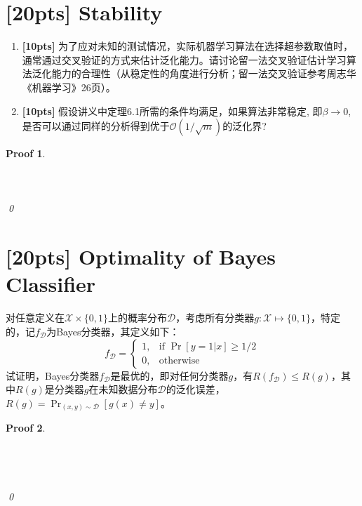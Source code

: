 \documentclass[a4paper,UTF8]{article}
\numberwithin{equation}{section}
\newtheorem*{myProof}{Proof}
\begin{document}
	\section{[20pts] Stability}
	\noindent
	
	\begin{enumerate}[ {(}1{)}]
		\item \textbf{[10pts]} 为了应对未知的测试情况，实际机器学习算法在选择超参数取值时，通常通过交叉验证的方式来估计泛化能力。请讨论留一法交叉验证估计学习算法泛化能力的合理性（从稳定性的角度进行分析；留一法交叉验证参考周志华《机器学习》26页）。
		\item \textbf{[10pts]} 假设讲义中定理6.1所需的条件均满足，如果算法非常稳定, 即$\beta\rightarrow 0$, 是否可以通过同样的分析得到优于$\mathcal{O}(1/\sqrt{m})$的泛化界?
	\end{enumerate}
	
	
	\begin{myProof}
		~\\
		~\\
		~\\
		~\\
		\qed
	\end{myProof}
	
	\newpage
	\section{[20pts] Optimality of Bayes Classifier}
	对任意定义在$\mathcal{X}\times\{0,1\}$上的概率分布$\mathcal{D}$，考虑所有分类器$g:\mathcal X \mapsto \{0,1\}$，特定的，记$f_{\mathcal{D}}$为Bayes分类器，其定义如下：
	\[
	f_{\mathcal{D}} = 
	\begin{cases}
	1,&\mbox{if }\Pr[y=1|x]\geq 1/2\\
	0,&\mbox{otherwise}
	\end{cases}
	\]
	试证明，Bayes分类器$f_{\mathcal D}$是最优的，即对任何分类器$g$，有$R(f_{\mathcal D}) \leq R(g)$，其中$R(g)$是分类器$g$在未知数据分布$\mathcal{D}$的泛化误差，$R(g) = \Pr_{(x,y) \sim \mathcal{D}}[g(x) \neq y]$。
	
	\begin{myProof}~\\
		~\\
		~\\
		~\\
		~\\	
		\qed
	\end{myProof}
	\newpage
	
\end{document}
